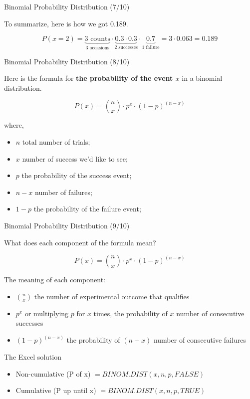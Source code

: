 \documentclass{beamer}
\begin{document}
\begin{frame}{Binomial Probability Distribution (7/10)}

To summarize, here is how we got 0.189. 

\vspace{0.3 cm}
$$P(x=2) = \underbrace{3 \text{ counts}}_{\text{3 occasions}}  \cdot \underbrace{0.3 \cdot 0.3}_{\text{2 successes}} \cdot \underbrace{0.7}_{\text{1 failure}} = 3 \cdot 0.063 = 0.189$$


\end{frame}



\begin{frame}{Binomial Probability Distribution (8/10)}

\vspace{0.3 cm}
Here is the formula for \textbf{the probability of the event $x$ }in a binomial distribution.

$$ P(x) = {n \choose x}  \cdot p^x \cdot (1-p)^{(n-x)} $$

where,
\begin{itemize}
\item $n$ total number of trials; 
\item $x$ number of success we'd like to see; 
\item $p$ the probability of the success event;
\item $n-x$ number of failures;
\item $1-p$ the probability of the failure event;
\end{itemize}



\end{frame}



\begin{frame}{Binomial Probability Distribution (9/10)}

What does each component of the formula mean? 

$$ P(x) = {n \choose x}  \cdot p^x \cdot (1-p)^{(n-x)} $$

The meaning of each component:
\begin{itemize}
\item ${n \choose x}$ the number of experimental outcome that qualifies
\item $p^x$ or multiplying $p$ for $x$ times, the probability of $x$ number of consecutive successes
\item $(1-p)^{(n-x)}$ the probability of $(n-x)$ number of consecutive failures
\end{itemize}

\vspace{0.3 cm}
The Excel solution
\begin{itemize}
\item Non-cumulative (P of x) $=BINOM.DIST(x, n, p, FALSE)$
\item Cumulative (P up until x) $=BINOM.DIST(x, n, p, TRUE)$
\end{itemize}

 \end{frame}
\end{document}
